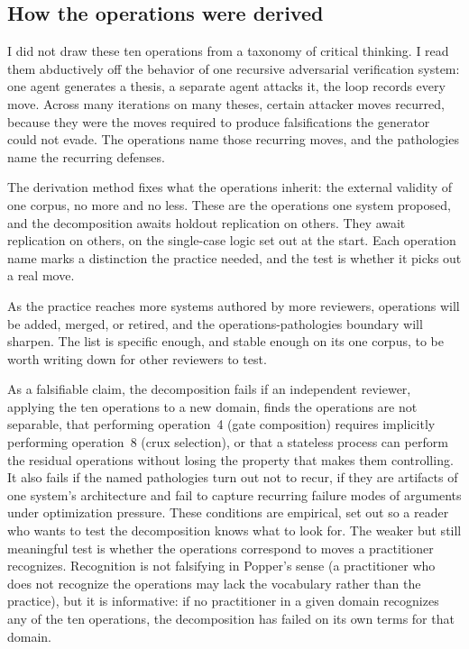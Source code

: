 \documentclass[
  11pt,
]{article}
\begin{document}
\subsection{How the operations were
derived}\label{how-the-operations-were-derived}

I did not draw these ten operations from a taxonomy of critical thinking.
I read them abductively off the behavior of one recursive adversarial
verification system: one agent generates a thesis, a separate agent
attacks it, the loop records every move. Across many iterations on
many theses, certain attacker moves recurred, because they were the moves
required to produce falsifications the generator could not evade. The
operations name those recurring moves, and the pathologies name the
recurring defenses.

The derivation method fixes what the operations inherit: the external
validity of one corpus, no more and no less. These are the operations one
system proposed, and the decomposition awaits holdout replication on
others. They await replication on others, on the single-case logic set out at the start. Each operation name marks a distinction the practice
needed, and the test is whether it picks out a real move.

As the practice reaches more systems authored by more reviewers,
operations will be added, merged, or retired, and the
operations-pathologies boundary will sharpen. The list is specific enough,
and stable enough on its one corpus, to be worth writing down for other
reviewers to test.

As a falsifiable claim, the decomposition fails if an
independent reviewer, applying the ten operations to a
new domain, finds the operations are not separable, that
performing operation~4 (gate composition) requires implicitly performing
operation~8 (crux selection), or that a stateless process can perform the residual
operations without losing the
property that makes them controlling. It also fails if the
named pathologies turn out not to recur, if they are artifacts of
one system's architecture and fail to capture recurring failure modes
of arguments under optimization pressure. These conditions are
empirical, set out so a reader who wants to test the decomposition
knows what to look for.
The weaker but still meaningful test is whether the operations correspond
to moves a practitioner recognizes. Recognition is not falsifying in
Popper's sense (a practitioner who does not recognize the operations may
lack the vocabulary rather than the practice), but it is informative: if
no practitioner in a given domain recognizes any of the ten operations,
the decomposition has failed on its own terms for that domain.
\end{document}
